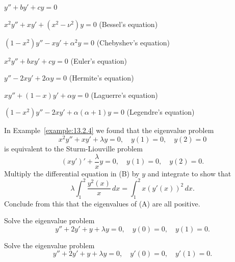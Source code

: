 \begin{exerciselist}
  \item\label{exer:13.2.1} $y''+by'+cy=0$

  \item\label{exer:13.2.2} $x^{2}y''+xy'+(x^{2}-\nu^{2})y=0$ \quad (Bessel's equation)

  \item\label{exer:13.2.3} $(1-x^{2})y''-xy'+\alpha^{2}y=0$ \quad (Chebyshev's equation)

  \item\label{exer:13.2.4} $x^{2}y''+bxy'+cy=0$ \quad (Euler's equation)

  \item\label{exer:13.2.5} $y''-2xy'+2\alpha y=0$ \quad (Hermite's equation)

  \item\label{exer:13.2.6} $xy''+(1-x)y'+\alpha y=0$ \quad (Laguerre's equation)

  \item\label{exer:13.2.7} $(1-x^{2})y''-2xy'+\alpha(\alpha+1)y=0$ \quad (Legendre's equation)

  \item\label{exer:13.2.8} In Example~\ref{example:13.2.4} we found that the eigenvalue problem
  \begin{equation}
    x^{2}y''+xy'+\lambda y=0,\quad y(1)=0,\quad y(2)=0\tag{A}
  \end{equation}
  is equivalent to the Sturm-Liouville problem
  \begin{equation}
    \tag{B}(xy')'+\frac{\lambda}{x}y=0,\quad y(1)=0,\quad y(2)=0.
  \end{equation}
  Multiply the differential equation in (B) by $y$ and integrate to show that
  \[
    \lambda\int_{1}^{2}\frac{y^{2}(x)}{x}\,dx=\int_{1}^{2}x(y'(x))^{2}\,dx.
  \]
  Conclude from this that the eigenvalues of (A) are all positive.

  \item\label{exer:13.2.9} Solve the eigenvalue problem
  \[
    y''+2y'+y+\lambda y=0,\quad y(0)=0,\quad y(1)=0.
  \]

  \item\label{exer:13.2.10} Solve the eigenvalue problem
  \[
    y''+2y'+y+\lambda y=0,\quad y'(0)=0,\quad y'(1)=0.
  \]

\end{exerciselist}
